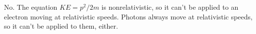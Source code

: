 No. The equation $KE=p^2/2m$ is nonrelativistic, so it can't be applied to
an electron moving at relativistic speeds. Photons always move at
relativistic speeds, so it can't be applied to them, either.



